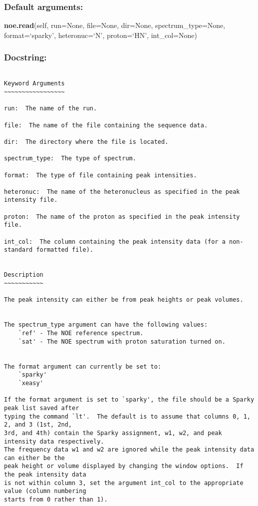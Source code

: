 \subsubsection{Default arguments:}

\textsf{\textbf{noe.read}(self, run=None, file=None, dir=None, spectrum\_type=None, format=`sparky', heteronuc=`N', proton=`HN', int\_col=None)
}


\subsubsection{Docstring:}

{\scriptsize
\begin{verbatim}

Keyword Arguments
~~~~~~~~~~~~~~~~~

run:  The name of the run.

file:  The name of the file containing the sequence data.

dir:  The directory where the file is located.

spectrum_type:  The type of spectrum.

format:  The type of file containing peak intensities.

heteronuc:  The name of the heteronucleus as specified in the peak intensity file.

proton:  The name of the proton as specified in the peak intensity file.

int_col:  The column containing the peak intensity data (for a non-standard formatted file).


Description
~~~~~~~~~~~

The peak intensity can either be from peak heights or peak volumes.


The spectrum_type argument can have the following values:
    `ref' - The NOE reference spectrum.
    `sat' - The NOE spectrum with proton saturation turned on.


The format argument can currently be set to:
    `sparky'
    `xeasy'

If the format argument is set to `sparky', the file should be a Sparky peak list saved after
typing the command `lt'.  The default is to assume that columns 0, 1, 2, and 3 (1st, 2nd,
3rd, and 4th) contain the Sparky assignment, w1, w2, and peak intensity data respectively.
The frequency data w1 and w2 are ignored while the peak intensity data can either be the
peak height or volume displayed by changing the window options.  If the peak intensity data
is not within column 3, set the argument int_col to the appropriate value (column numbering
starts from 0 rather than 1).


\end{verbatim}}
